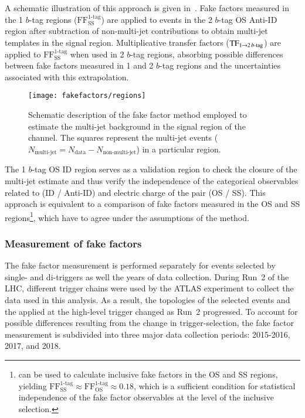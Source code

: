 A schematic illustration of this approach is given
in~. Fake factors measured in the 1
$b$-tag regions ($\text{FF}_\text{SS}^\text{1-tag}$) are applied to
events in the 2 $b$-tag OS Anti-ID region after subtraction of
non-multi-jet contributions to obtain multi-jet templates in the
signal region. Multiplicative transfer factors
($\text{TF}_{1 \rightarrow 2\,b\text{-tag}}$) are applied to
$\text{FF}_\text{SS}^\text{1-tag}$ when used in 2 $b$-tag regions,
absorbing possible differences between fake factors measured in 1 and
2 $b$-tag regions and the uncertainties associated with this
extrapolation.

\begin{figure}[htbp]
  \centering

  \texttt{[image: fakefactors/regions]}

  \caption{Schematic description of the fake factor method employed to
    estimate the multi-jet background in the signal region of the
    \hadhad channel. The squares represent the multi-jet events
    ($N_\text{multi-jet} = N_\text{data} - N_\text{non-multi-jet}$) in
    a particular region.}
  \label{fig:fakefactor_regions}
\end{figure}

The 1 $b$-tag OS ID region serves as a validation region to check the
closure of the multi-jet estimate and thus verify the independence of
the categorical observables related to \tauid (ID / Anti-ID) and
electric charge of the \tauhadvis pair (OS / SS). This approach is
equivalent to a comparison of
fake factors measured in the OS and SS
regions\footnote{ can be used to
  calculate inclusive fake factors in the OS and SS regions, yielding
  $\text{FF}_\text{SS}^\text{1-tag} \approx
  \text{FF}_\text{OS}^\text{1-tag} \approx 0.18$, which is a
  sufficient condition for statistical independence of the fake factor
  observables at the level of the inclusive selection.}, which have to
agree under the assumptions of the method.


\subsubsection{Measurement of fake factors}

The fake factor measurement is performed separately for events
selected by single- and di-\tauhadvis triggers as well the years of
data collection. During Run~2 of the LHC, different \tauhadvis trigger
chains were used by the ATLAS experiment to collect the data used in
this analysis. As a result, the topologies of the selected events and
the \tauid applied at the high-level trigger changed as Run~2
progressed. To account for possible differences resulting from the
change in trigger-selection, the fake factor measurement is subdivided
into three major data collection periods: 2015-2016, 2017, and 2018.

